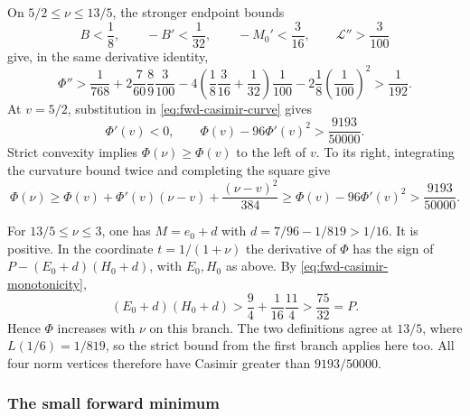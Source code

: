 On $5/2\le\nu\le13/5$, the stronger endpoint bounds
\[
 B<\frac18,\qquad -B'<\frac1{32},\qquad
 -M_0'<\frac3{16},\qquad \mathcal L''>\frac3{100}
\]
give, in the same derivative identity,
\[
 \Phi''>
 \frac1{768}+2\frac7{60}\frac89\frac3{100}
 -4\left(\frac18\frac3{16}+\frac1{32}\right)\frac1{100}
 -2\frac18\left(\frac1{100}\right)^2>\frac1{192}.
\]
At $v=5/2$, substitution in \eqref{eq:fwd-casimir-curve} gives
\[
 \Phi'(v)<0,\qquad \Phi(v)-96\Phi'(v)^2>\frac{9193}{50000}.
\]
Strict convexity implies $\Phi(\nu)\ge\Phi(v)$ to the left of $v$.
To its right, integrating the curvature bound twice and completing the square give
\[
 \Phi(\nu)\ge\Phi(v)+\Phi'(v)(\nu-v)+\frac{(\nu-v)^2}{384}
 \ge\Phi(v)-96\Phi'(v)^2>\frac{9193}{50000}.
\]

For $13/5\le\nu\le3$, one has
$M=e_0+d$ with $d=7/96-1/819>1/16$. It is positive.
In the coordinate $t=1/(1+\nu)$ the derivative of $\Phi$ has the sign of
$P-(E_0+d)(H_0+d)$, with $E_0,H_0$ as above.
By \eqref{eq:fwd-casimir-monotonicity},
\[
 (E_0+d)(H_0+d)>\frac94+\frac1{16}\frac{11}4>\frac{75}{32}=P.
\]
Hence $\Phi$ increases with $\nu$ on this branch. The two definitions agree at $13/5$,
where $L(1/6)=1/819$, so the strict bound from the first branch applies here too.
All four norm vertices therefore have Casimir greater than $9193/50000$.


\subsubsection{The small forward minimum}\label{app:fwd-small}

